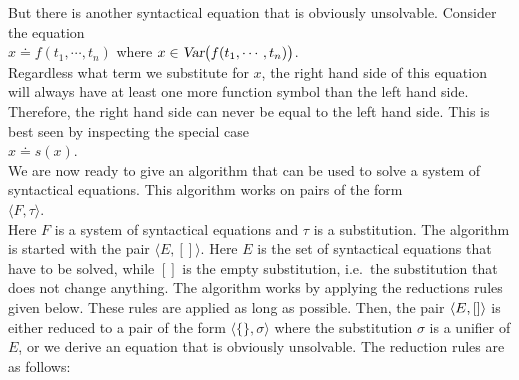 But there is another syntactical equation that is obviously unsolvable.  Consider the equation
\\[0.2cm]
\hspace*{1.3cm} 
$x \doteq f(t_1,\cdots,t_n)$  \quad where $x \in \textsl{Var}\big(f(t_1,\cdots,t_n)\big)$. \\[0.2cm]
Regardless what term we substitute for $x$, the right hand side of this equation will
always have at least one more function symbol than the left hand side.  Therefore, the right hand
side can never be equal to the left hand side.  This is best seen by inspecting the special case
\\[0.2cm]
\hspace*{1.3cm}
$x \doteq s(x)$.
\\[0.2cm]
We are now ready to give an algorithm that can be used to solve a system of syntactical
equations.  This algorithm works on pairs of the form
\\[0.2cm]
\hspace*{1.3cm}
$\langle F, \tau \rangle$.  
\\[0.2cm]
Here $F$ is a system of syntactical equations and $\tau$ is a substitution.  The algorithm
is started with the pair $\langle E, [] \rangle$.  Here $E$ is the set of syntactical
equations that have to be solved, while  $[]$ is the empty  substitution, i.e.~the
substitution that does not change anything.  The algorithm works by applying the
reductions rules given below.  These rules are applied as long as possible.  Then, the
pair $\pair(E, [])$ is either reduced to a pair of the form 
$\langle \{\}, \sigma \rangle$ where the substitution $\sigma$ is a unifier of $E$, or we
derive an equation that is obviously unsolvable.  
The reduction rules are as follows:
